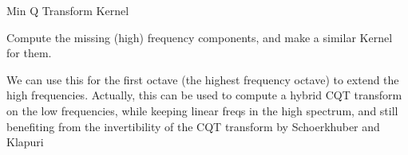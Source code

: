 \documentclass[letterpaper,10pt,english]{sphinxmanual}
\begin{document}
\begin{fulllineitems}
\label{reference/tftransforms:pyfasst.tftransforms.minqt.MinQTKernel}
Min Q Transform Kernel

\begin{fulllineitems}
\label{reference/tftransforms:pyfasst.tftransforms.minqt.MinQTKernel.computeMissingLinearFreqKernel}
Compute the missing (high) frequency
components, and make a similar Kernel for them.

We can use this for the first octave (the highest frequency octave)
to extend the high frequencies. Actually, this can be used to compute
a hybrid CQT transform on the low frequencies, while keeping linear
freqs in the high spectrum, and still benefiting from the invertibility
of the CQT transform by Schoerkhuber and Klapuri

\end{fulllineitems}


\end{fulllineitems}

\end{document}
